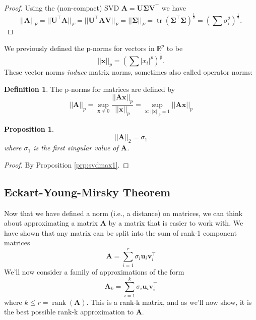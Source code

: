 \documentclass[
]{book}
\newtheorem{proposition}{Proposition}[chapter]
\theoremstyle{definition}
\newtheorem{definition}{Definition}[chapter]
\theoremstyle{definition}
\theoremstyle{definition}
\theoremstyle{definition}
\theoremstyle{remark}
\begin{document}
\begin{proof}
Using the (non-compact) SVD
\(\mathbf A= \mathbf U\boldsymbol{\Sigma}\mathbf V^\top\)
we have \[||\mathbf A||_F=||\mathbf U^\top \mathbf A||_F = ||\mathbf U^\top \mathbf A\mathbf V||_F = ||\boldsymbol{\Sigma}||_F=\operatorname{tr}(\boldsymbol{\Sigma}^\top\boldsymbol{\Sigma})^\frac{1}{2}=\left(\sum \sigma_i^2 \right)^\frac{1}{2}.\]
\end{proof}

We previously defined the p-norms for vectors in \(\mathbb{R}^p\) to be
\[||\mathbf x||_p = \left(\sum |x_i|^p\right)^{\frac{1}{p}}.\]
These vector norms \emph{induce} matrix norms, sometimes also called operator norms:

\begin{definition}
\protect\hypertarget{def:matrixnorm}{}\label{def:matrixnorm}The p-norms for matrices are defined by
\[||\mathbf A||_p = \sup_{\mathbf x\not=0} \frac{||\mathbf A\mathbf x||_p}{||\mathbf x||_p} = \sup_{\mathbf x: ||\mathbf x||_p=1} ||\mathbf A\mathbf x||_p\]
\end{definition}

\begin{proposition}
\protect\hypertarget{prp:L2matrixnorm}{}\label{prp:L2matrixnorm}\[||\mathbf A||_2 = \sigma_1\]
where \(\sigma_1\) is the first singular value of \(\mathbf A\).
\end{proposition}

\begin{proof}
By Proposition \ref{prp:svdmax1}.
\end{proof}

\subsection{Eckart-Young-Mirsky Theorem}\label{eckart-young-mirsky-theorem}

Now that we have defined a norm (i.e., a distance) on matrices, we can think about approximating a matrix \(\mathbf A\) by a matrix that is easier to work with. We have shown that any matrix can be split into the sum of rank-1 component matrices
\[\mathbf A= \sum_{i=1}^r \sigma_i \mathbf u_i \mathbf v_i^\top\]
We'll now consider a family of approximations of the form
\begin{equation}
\mathbf A_k = \sum_{i=1}^k \sigma_i \mathbf u_i \mathbf v_i^\top
\label{eq:svdreduced}
\end{equation}
where \(k\leq r=\operatorname{rank}(\mathbf A)\). This is a rank-k matrix, and as we'll now show, it is the best possible rank-k approximation to \(\mathbf A\).
\end{document}
